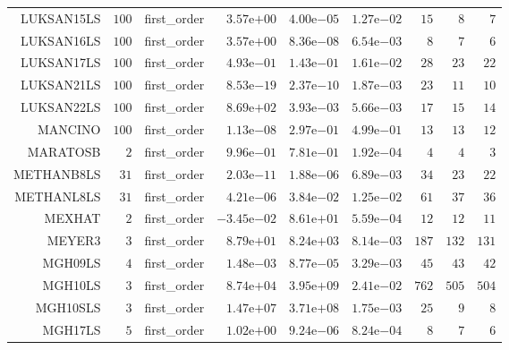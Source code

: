 \begin{longtable}{rrrrrrrrr}
LUKSAN15LS & \(   100\) & first\_order & \( 3.57\)e\(+00\) & \( 4.00\)e\(-05\) & \( 1.27\)e\(-02\) & \(    15\) & \(     8\) & \(     7\) \\
LUKSAN16LS & \(   100\) & first\_order & \( 3.57\)e\(+00\) & \( 8.36\)e\(-08\) & \( 6.54\)e\(-03\) & \(     8\) & \(     7\) & \(     6\) \\
LUKSAN17LS & \(   100\) & first\_order & \( 4.93\)e\(-01\) & \( 1.43\)e\(-01\) & \( 1.61\)e\(-02\) & \(    28\) & \(    23\) & \(    22\) \\
LUKSAN21LS & \(   100\) & first\_order & \( 8.53\)e\(-19\) & \( 2.37\)e\(-10\) & \( 1.87\)e\(-03\) & \(    23\) & \(    11\) & \(    10\) \\
LUKSAN22LS & \(   100\) & first\_order & \( 8.69\)e\(+02\) & \( 3.93\)e\(-03\) & \( 5.66\)e\(-03\) & \(    17\) & \(    15\) & \(    14\) \\
MANCINO & \(   100\) & first\_order & \( 1.13\)e\(-08\) & \( 2.97\)e\(-01\) & \( 4.99\)e\(-01\) & \(    13\) & \(    13\) & \(    12\) \\
MARATOSB & \(     2\) & first\_order & \( 9.96\)e\(-01\) & \( 7.81\)e\(-01\) & \( 1.92\)e\(-04\) & \(     4\) & \(     4\) & \(     3\) \\
METHANB8LS & \(    31\) & first\_order & \( 2.03\)e\(-11\) & \( 1.88\)e\(-06\) & \( 6.89\)e\(-03\) & \(    34\) & \(    23\) & \(    22\) \\
METHANL8LS & \(    31\) & first\_order & \( 4.21\)e\(-06\) & \( 3.84\)e\(-02\) & \( 1.25\)e\(-02\) & \(    61\) & \(    37\) & \(    36\) \\
MEXHAT & \(     2\) & first\_order & \(-3.45\)e\(-02\) & \( 8.61\)e\(+01\) & \( 5.59\)e\(-04\) & \(    12\) & \(    12\) & \(    11\) \\
MEYER3 & \(     3\) & first\_order & \( 8.79\)e\(+01\) & \( 8.24\)e\(+03\) & \( 8.14\)e\(-03\) & \(   187\) & \(   132\) & \(   131\) \\
MGH09LS & \(     4\) & first\_order & \( 1.48\)e\(-03\) & \( 8.77\)e\(-05\) & \( 3.29\)e\(-03\) & \(    45\) & \(    43\) & \(    42\) \\
MGH10LS & \(     3\) & first\_order & \( 8.74\)e\(+04\) & \( 3.95\)e\(+09\) & \( 2.41\)e\(-02\) & \(   762\) & \(   505\) & \(   504\) \\
MGH10SLS & \(     3\) & first\_order & \( 1.47\)e\(+07\) & \( 3.71\)e\(+08\) & \( 1.75\)e\(-03\) & \(    25\) & \(     9\) & \(     8\) \\
MGH17LS & \(     5\) & first\_order & \( 1.02\)e\(+00\) & \( 9.24\)e\(-06\) & \( 8.24\)e\(-04\) & \(     8\) & \(     7\) & \(     6\) \\

\end{longtable}
